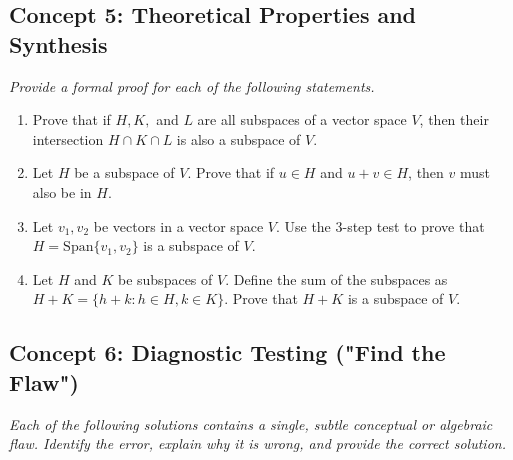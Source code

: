 \documentclass[11pt]{article}
\begin{document}
\subsection*{Concept 5: Theoretical Properties and Synthesis}
\textit{Provide a formal proof for each of the following statements.}

\begin{enumerate}[resume]
    \item Prove that if $H, K,$ and $L$ are all subspaces of a vector space $V$, then their intersection $H \cap K \cap L$ is also a subspace of $V$.
    \item Let $H$ be a subspace of $V$. Prove that if $u \in H$ and $u+v \in H$, then $v$ must also be in $H$.
    \item Let $v_1, v_2$ be vectors in a vector space $V$. Use the 3-step test to prove that $H = \text{Span}\{v_1, v_2\}$ is a subspace of $V$.
    \item Let $H$ and $K$ be subspaces of $V$. Define the sum of the subspaces as $H+K = \{h+k : h \in H, k \in K\}$. Prove that $H+K$ is a subspace of $V$.
\end{enumerate}

\subsection*{Concept 6: Diagnostic Testing ("Find the Flaw")}
\textit{Each of the following solutions contains a single, subtle conceptual or algebraic flaw. Identify the error, explain why it is wrong, and provide the correct solution.}
\end{document}
